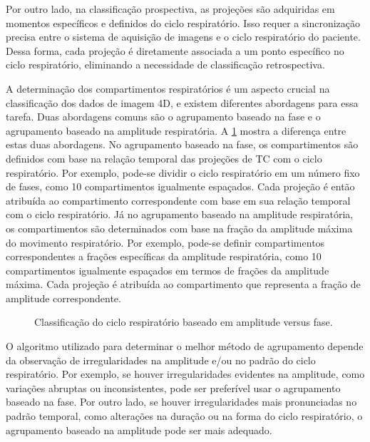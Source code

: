\documentclass[11pt,a4paper]{article}
\newcounter{exemplo}
\begin{document}
	Por outro lado, na classificação prospectiva, as projeções são adquiridas em momentos específicos e definidos do ciclo respiratório. Isso requer a sincronização precisa entre o sistema de aquisição de imagens e o ciclo respiratório do paciente. Dessa forma, cada projeção é diretamente associada a um ponto específico no ciclo respiratório, eliminando a necessidade de classificação retrospectiva.

	A determinação dos compartimentos respiratórios é um aspecto crucial na classificação dos dados de imagem 4D, e existem diferentes abordagens para essa tarefa. Duas abordagens comuns são o agrupamento baseado na fase e o agrupamento baseado na amplitude respiratória. A \ref{fig:gmrAmplitudeDeFase} mostra a diferença entre estas duas abordagens. No agrupamento baseado na fase, os compartimentos são definidos com base na relação temporal das projeções de TC com o ciclo respiratório. Por exemplo, pode-se dividir o ciclo respiratório em um número fixo de fases, como 10 compartimentos igualmente espaçados. Cada projeção é então atribuída ao compartimento correspondente com base em sua relação temporal com o ciclo respiratório. Já no agrupamento baseado na amplitude respiratória, os compartimentos são determinados com base na fração da amplitude máxima do movimento respiratório. Por exemplo, pode-se definir compartimentos correspondentes a frações específicas da amplitude respiratória, como 10 compartimentos igualmente espaçados em termos de frações da amplitude máxima. Cada projeção é atribuída ao compartimento que representa a fração de amplitude correspondente. 

	\begin{figure}[h]
		\centering
		\caption{Classificação do ciclo respiratório baseado em amplitude versus fase.}
		\label{fig:gmrAmplitudeDeFase}
	\end{figure}


	O algoritmo utilizado para determinar o melhor método de agrupamento depende da observação de irregularidades na amplitude e/ou no padrão do ciclo respiratório. Por exemplo, se houver irregularidades evidentes na amplitude, como variações abruptas ou inconsistentes, pode ser preferível usar o agrupamento baseado na fase. Por outro lado, se houver irregularidades mais pronunciadas no padrão temporal, como alterações na duração ou na forma do ciclo respiratório, o agrupamento baseado na amplitude pode ser mais adequado. 
\end{document}
